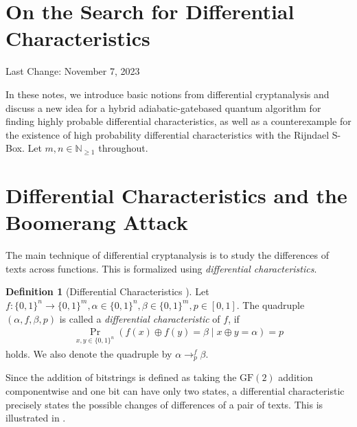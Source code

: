 \documentclass[10pt]{amsart}
\theoremstyle{definition}
\newtheorem{definition}{Definition}
\theoremstyle{remark}
\begin{document}
    \section*{On the Search for Differential Characteristics} \hfill \hfill Last Change: November 7, 2023

    In these notes, we introduce basic notions from differential cryptanalysis and discuss a new idea for a hybrid adiabatic-gatebased quantum algorithm for finding highly probable differential characteristics, as well as a counterexample for the existence of high probability differential characteristics with the Rijndael S-Box. Let \(m, n \in \mathbb{N}_{\geq 1}\) throughout.

    \section{Differential Characteristics and the Boomerang Attack} The main technique of differential cryptanalysis is to study the differences of texts across functions. This is formalized using \emph{differential characteristics}.

    \begin{definition}[{Differential Characteristics \cite[p. 116]{Knudsen}}]
        Let \(f\colon \{0, 1\}^n \to \{0, 1\}^m, \alpha \in \{0, 1\}^n, \beta \in \{0, 1\}^m, p \in [0, 1]\). The quadruple \((\alpha, f, \beta, p)\) is called a \emph{differential characteristic} of \(f\), if
        \begin{align}
            \Pr_{x, y \in \{0, 1\}^n}(f(x) \oplus f(y) = \beta \mid x \oplus y = \alpha) = p
        \end{align}
        holds. We also denote the quadruple by \(\alpha \to_p^f \beta\).
    \end{definition}

    Since the addition of bitstrings is defined as taking the \(\text{GF}(2)\) addition componentwise and one bit can have only two states, a differential characteristic precisely states the possible changes of differences of a pair of texts. This is illustrated in .
\end{document}
